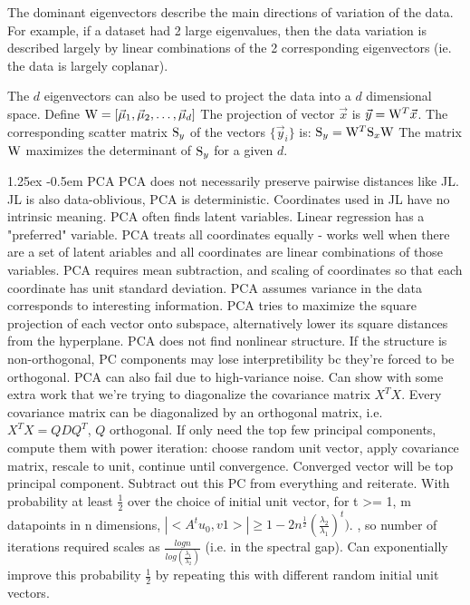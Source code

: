\documentclass[8pt]{article}
\makeatletter
\newlength{\norm}
\newlength{\nrm}
\renewcommand{\paragraph}{%
  \@startsection{paragraph}{4}%
  {\z@}{1.25ex \@plus 2pt \@minus 2pt}{-0.5em}%
  {\fontsize{\f@size}{\nrm}\normalfont\bfseries}%
}
\makeatother
\begin{document}
The dominant eigenvectors describe the main directions of variation of
the data. For example, if a dataset had 2 large eigenvalues, then
the data variation is described largely by linear combinations of
the 2 corresponding eigenvectors (ie. the data is largely coplanar).

The $d$ eigenvectors can also be used to project the data into a
$d$ dimensional space.
Define ${\bf \rm W} = [\vec{\mu}_1, \vec{\mu}_2, \dots, \vec{\mu}_d ]$
The projection of vector $\vec{x}$ is $\vec{y} = {\bf \rm W}^T \vec{x}$.
The corresponding scatter matrix ${\bf \rm S}_y$ of the
vectors $\{ \vec{y}_i \}$ is: ${\bf \rm S}_y = {\bf \rm W}^T {\bf \rm S}_x {\bf \rm W}$
The matrix ${\bf \rm W}$ maximizes the determinant of ${\bf \rm S}_y$
for a given $d$.


\paragraph{PCA} PCA does not necessarily preserve pairwise distances like JL. JL is also data-oblivious, PCA is deterministic. Coordinates used in JL have no intrinsic meaning. PCA often finds latent variables. Linear regression has a "preferred" variable. PCA treats all coordinates equally - works well when there are a set of latent ariables and all coordinates are linear combinations of those variables. PCA requires mean subtraction, and scaling of coordinates so that each coordinate has unit standard deviation. PCA assumes variance in the data corresponds to interesting information. PCA tries to maximize the square projection of each vector onto subspace, alternatively lower its square distances from the hyperplane. PCA does not find nonlinear structure. If the structure is non-orthogonal, PC components may lose interpretibility bc they're forced to be orthogonal. PCA can also fail due to high-variance noise. Can show with some extra work that we're trying to diagonalize the covariance matrix $X^TX$. Every covariance matrix can be diagonalized by an orthogonal matrix, i.e. $X^TX = QDQ^T$, $Q$ orthogonal. If only need the top few principal components, compute them with power iteration: choose random unit vector, apply covariance matrix, rescale to unit, continue until convergence. Converged vector will be top principal component. Subtract out this PC from everything and reiterate.  With probability at least $\frac{1}{2}$ over the choice of initial unit vector, for t >= 1, m datapoints in n dimensions, $|<A^tu_0, v1>| \geq 1 - 2n^\frac{1}{2}(\frac{\lambda_2}{\lambda_1})^t)$. , so number of iterations required scales as $\frac{logn}{log(\frac{\lambda_1}{\lambda_2})}$ (i.e. in the spectral gap). Can exponentially improve this probability $\frac{1}{2}$ by repeating this with different random initial unit vectors. 
\end{document}
